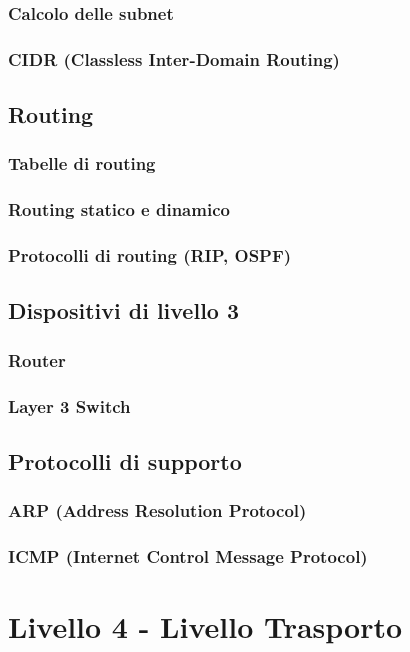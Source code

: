 \documentclass[12pt,a4paper]{article}
\begin{document}
\subsubsection{Calcolo delle subnet}
\subsubsection{CIDR (Classless Inter-Domain Routing)}
\subsection{Routing}
\subsubsection{Tabelle di routing}
\subsubsection{Routing statico e dinamico}
\subsubsection{Protocolli di routing (RIP, OSPF)}
\subsection{Dispositivi di livello 3}
\subsubsection{Router}
\subsubsection{Layer 3 Switch}
\subsection{Protocolli di supporto}
\subsubsection{ARP (Address Resolution Protocol)}
\subsubsection{ICMP (Internet Control Message Protocol)}

\section{Livello 4 - Livello Trasporto}
\end{document}
